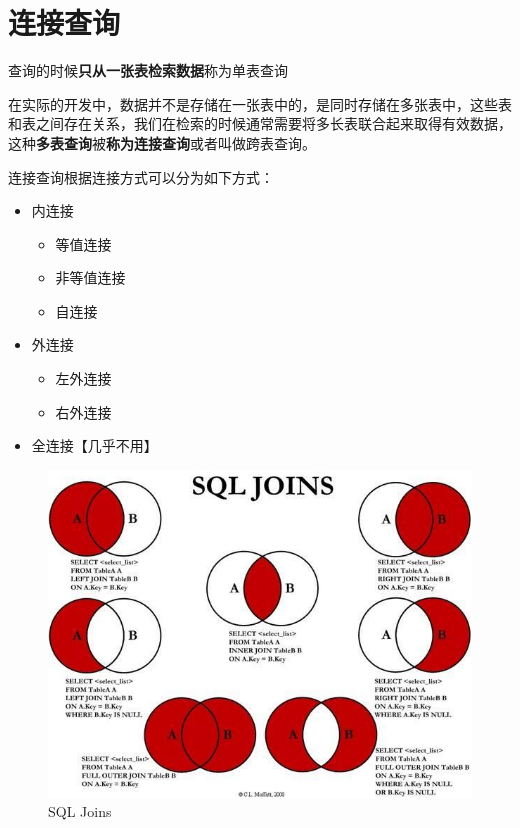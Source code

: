 \documentclass[UTF8,a4paper,12pt]{ctexbook}
\begin{document}
\section{连接查询}
	查询的时候\textbf{只从一张表检索数据}称为单表查询
	
	在实际的开发中，数据并不是存储在一张表中的，是同时存储在多张表中，这些表和表之间存在关系，我们在检索的时候通常需要将多长表联合起来取得有效数据，这种\textbf{多表查询}被\textbf{称为连接查询}或者叫做跨表查询。
	
	连接查询根据连接方式可以分为如下方式：
		\begin{itemize}[itemindent = 2em]
			\item  内连接
				\begin{itemize}[itemindent = 3em]
					\item 等值连接
					\item 非等值连接
					\item 自连接
				\end{itemize}
				
			\item  外连接
				\begin{itemize}[itemindent = 3em]
					\item 左外连接
					\item 右外连接
				\end{itemize}
				
			\item  全连接【几乎不用】
		\end{itemize}
		
		\begin{figure}[H]
			\centering
			\includegraphics[scale=.76]{joins}
			\caption{SQL Joins}
		\end{figure}
		
\end{document}

